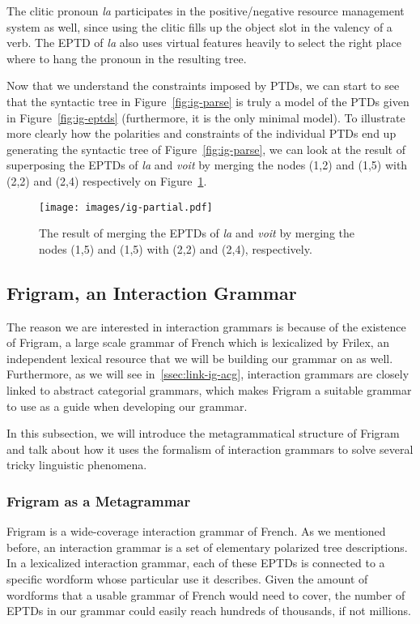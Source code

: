 The clitic pronoun \emph{la} participates in the positive/negative
resource management system as well, since using the clitic fills up the
object slot in the valency of a verb. The EPTD of \emph{la} also uses
virtual features heavily to select the right place where to hang the
pronoun in the resulting tree.

Now that we understand the constraints imposed by PTDs, we can start to
see that the syntactic tree in Figure~\ref{fig:ig-parse} is truly a
model of the PTDs given in Figure~\ref{fig:ig-eptds} (furthermore, it is
the only minimal model). To illustrate more clearly how the polarities
and constraints of the individual PTDs end up generating the syntactic
tree of Figure~\ref{fig:ig-parse}, we can look at the result of
superposing the EPTDs of \emph{la} and \emph{voit} by merging the nodes
(1,2) and (1,5) with (2,2) and (2,4) respectively on
Figure~\ref{fig:ig-partial}.

\begin{figure}
  \centering
  \texttt{[image: images/ig-partial.pdf]}
  \caption{\label{fig:ig-partial} The result of merging the EPTDs of
    \emph{la} and \emph{voit} by merging the nodes (1,5) and (1,5) with
    (2,2) and (2,4), respectively.}
\end{figure}

\subsection{Frigram, an Interaction Grammar}
\label{ssec:frigram}

The reason we are interested in interaction grammars is because of the
existence of Frigram, a large scale grammar of French which is
lexicalized by Frilex, an independent lexical resource that we will be
building our grammar on as well. Furthermore, as we will see
in~\ref{ssec:link-ig-acg}, interaction grammars are closely linked to
abstract categorial grammars, which makes Frigram a suitable grammar to
use as a guide when developing our grammar.

In this subsection, we will introduce the metagrammatical structure of
Frigram and talk about how it uses the formalism of interaction grammars
to solve several tricky linguistic phenomena.

\subsubsection{Frigram as a Metagrammar}

Frigram is a wide-coverage interaction grammar of French. As we
mentioned before, an interaction grammar is a set of elementary
polarized tree descriptions. In a lexicalized interaction grammar, each
of these EPTDs is connected to a specific wordform whose particular use
it describes. Given the amount of wordforms that a usable grammar of
French would need to cover, the number of EPTDs in our grammar could
easily reach hundreds of thousands, if not millions.

